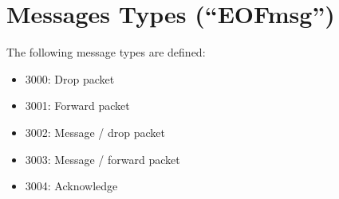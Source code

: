 \section{Messages Types ("`EOFmsg"')}
\label{eofmsg}
The following message types are defined:

\begin{itemize}
\item 3000: Drop packet
\item 3001: Forward packet
\item 3002: Message / drop packet
\item 3003: Message / forward packet
\item 3004: Acknowledge
\end{itemize}
